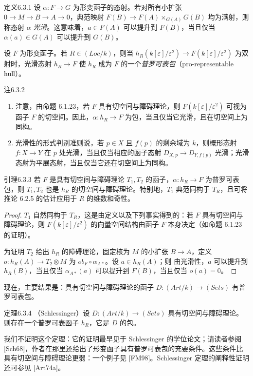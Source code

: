 \begin{origstatement}{定义}{6.3.1}\label{ch06:6.3.1}
设 $\alpha:F\to G$ 为形变函子的态射。若对所有小扩张 $0\to M\to B\to A\to0$，典范映射 $F(B)\to F(A)\times_{G(A)}G(B)$ 均为满射，则称态射 $\alpha$ \emph{光滑}。这意味着，$a\in F(A)$ 可以提升到 $F(B)$，当且仅当 $\alpha(a)\in G(A)$ 可以提升到 $G(B)$。

设 $F$ 为形变函子。若 $R\in(Loc/k)$，则当 $h_R(k[\varepsilon]/\varepsilon^2)\to F(k[\varepsilon]/\varepsilon^2)$ 为双射时，光滑态射 $h_R\to F$ 使 $h_R$ 成为 $F$ 的一个\emph{普罗可表包}（pro-representable hull）。
\end{origstatement}
\begin{origstatement}{注}{6.3.2}\label{ch06:6.3.2}
\begin{enumerate}[label=(\arabic*)]
\item 注意，由命题 6.1.23，若 $F$ 具有切空间与障碍理论，则 $F(k[\varepsilon]/\varepsilon^2)$ 可视为函子 $F$ 的切空间。因此，$\alpha:h_R\to F$ 为包，当且仅当它光滑，且在切空间上为同构。
\item 光滑性的形式判别准则说，若 $p\in X$ 且 $f(p)$ 的剩余域为 $k$，则概形态射 $f:X\to Y$ 在 $p$ 处光滑，当且仅当相应的函子态射 $D_{X,p}\to D_{Y,f(p)}$ 光滑；光滑态射为平展态射，当且仅当它还在切空间上为同构。
\end{enumerate}
\end{origstatement}
\begin{origstatement}{引理}{6.3.3}\label{ch06:6.3.3}
若 $F$ 是具有切空间与障碍理论 $T_1,T_2$ 的函子，$\alpha:h_R\to F$ 为普罗可表包，则 $T_1,T_2$ 也是 $h_R$ 的切空间与障碍理论。特别地，$T_1$ 典范同构于 $T_R$，且可将推论 6.2.5 的估计应用于 $R$ 的维数和奇性。
\end{origstatement}
\begin{proof}
$T_1$ 自然同构于 $T_R$，这是由定义以及下列事实得到的：若 $F$ 具有切空间与障碍理论，则 $F(k[\varepsilon]/\varepsilon^2)$ 的向量空间结构由函子 $F$ 本身决定（如命题 6.1.23 的证明）。

为证明 $T_2$ 给出 $h_R$ 的障碍理论，固定核为 $M$ 的小扩张 $B\to A$，定义 $o:h_R(A)\to T_2\otimes M$ 为 $ob_F\circ\alpha_{A*}$。设 $a\in h_R(A)$；则
由光滑性，$a$ 可以提升到 $h_R(B)$，当且仅当 $\alpha_{A*}(a)$ 可以提升到 $F(B)$，当且仅当 $o(a)=0$。
\end{proof}
现在，主要结果是：具有切空间与障碍理论的函子 $D:(Art/k)\to(Sets)$ 有普罗可表包。

\begin{origstatement}{定理}{6.3.4}\label{ch06:6.3.4}
（Schlessinger）设 $D:(Art/k)\to(Sets)$ 具有切空间与障碍理论。则存在一个普罗可表函子 $h_R$，它是 $D$ 的包。
\end{origstatement}
我们不证明这个定理：它的证明最早见于 Schlessinger 的学位论文；请读者参阅 [Sch68]，作者在那里还给出了形变函子具有普罗可表包的充要条件。这些条件比具有切空间与障碍理论更弱：一个例子见 [FM98]。Schlessinger 定理的阐释性证明还可参见 [Art74a]。


